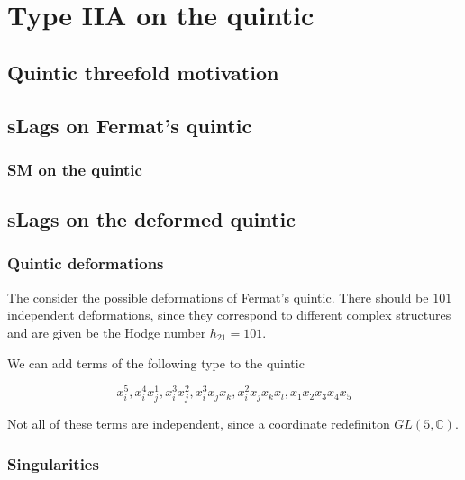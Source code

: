 \chapter{Type IIA on the quintic}

\section{Quintic threefold motivation}



\section{sLags on Fermat's quintic}

\subsection{SM on the quintic}

\section{sLags on the deformed quintic}

\subsection{Quintic deformations}
The consider the possible deformations of Fermat's quintic.
There should be $101$ independent deformations, since they correspond to different complex 
structures and are given be the Hodge number $h_{21}=101$.

We can add terms of the following type to the quintic

\begin{equation}
  x_i^5, x_i^4 x_j^1, x_i^3 x_j^2, x_i^3 x_j x_k, x_i^2 x_j x_k x_l, x_1 x_2 x_3 x_4 x_5
\end{equation}

Not all of these terms are independent, since a coordinate redefiniton $GL(5,\mathbb C)$.




\subsection{Singularities}

